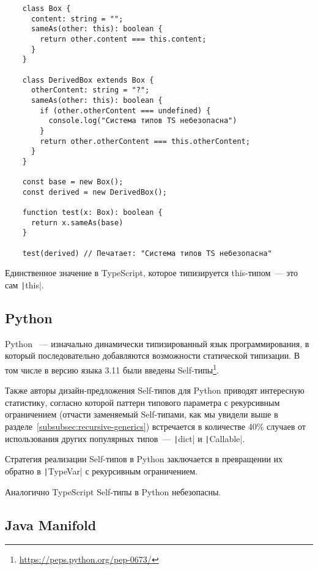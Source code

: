 \begin{verbatim}
    class Box {
      content: string = "";
      sameAs(other: this): boolean {
        return other.content === this.content;
      }
    }

    class DerivedBox extends Box {
      otherContent: string = "?";
      sameAs(other: this): boolean {
        if (other.otherContent === undefined) {
          console.log("Система типов TS небезопасна")
        }
        return other.otherContent === this.otherContent;
      }
    }

    const base = new Box();
    const derived = new DerivedBox();

    function test(x: Box): boolean {
      return x.sameAs(base)
    }

    test(derived) // Печатает: "Система типов TS небезопасна"
\end{verbatim}

Единственное значение в TypeScript, которое типизируется this-типом~--- это сам \texttt|this|.


\subsection{Python}

Python~\cite{sanner1999python} --- изначально динамически типизированный язык программирования, в который последовательно добавляются возможности статической типизации.
В том числе в версию языка 3.11 были введены Self-типы\footnote{\url{https://peps.python.org/pep-0673/}\label{foot:self-pep}}.

Также авторы дизайн-предложения Self-типов для Python приводят интересную статистику, согласно которой паттерн типового параметра с рекурсивным ограничением (отчасти заменяемый Self-типами, как мы увидели выше в разделе~\ref{subsubsec:recursive-generics}) встречается в количестве 40\% случаев от использования других популярных типов~--- \texttt|dict| и \texttt|Callable|.

Стратегия реализации Self-типов в Python заключается в превращении их обратно в \texttt|TypeVar| с рекурсивным ограничением.

Аналогично TypeScript Self-типы в Python небезопасны.


\subsection{Java Manifold}

